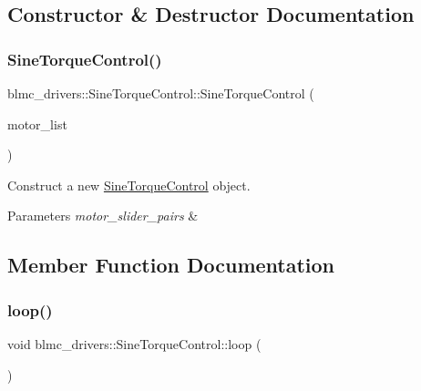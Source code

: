 \subsection{Constructor \& Destructor Documentation}
\mbox{\label{classblmc__drivers_1_1SineTorqueControl_ab3fcdb73429a6e4a664dc294f80e6d3c}} 
\subsubsection{\texorpdfstring{Sine\+Torque\+Control()}{SineTorqueControl()}}
{\footnotesize\ttfamily blmc\+\_\+drivers\+::\+Sine\+Torque\+Control\+::\+Sine\+Torque\+Control (\begin{DoxyParamCaption}\item[{std\+::vector$<$ \hyperlink{namespaceblmc__drivers_ab975c3be3c53a93a10c491f07a132e2b}{Safe\+Motor\+\_\+ptr} $>$}]{motor\+\_\+list }\end{DoxyParamCaption})\hspace{0.3cm}{\ttfamily [inline]}}



Construct a new \hyperlink{classblmc__drivers_1_1SineTorqueControl}{Sine\+Torque\+Control} object. 


\begin{DoxyParams}{Parameters}
{\em motor\+\_\+slider\+\_\+pairs} & \\
\hline
\end{DoxyParams}


\subsection{Member Function Documentation}
\mbox{\label{classblmc__drivers_1_1SineTorqueControl_a9f5f27389db0a303e2bae2f9c5135417}} 
\subsubsection{\texorpdfstring{loop()}{loop()}}
{\footnotesize\ttfamily void blmc\+\_\+drivers\+::\+Sine\+Torque\+Control\+::loop (\begin{DoxyParamCaption}{ }\end{DoxyParamCaption})\hspace{0.3cm}{\ttfamily [private]}}



